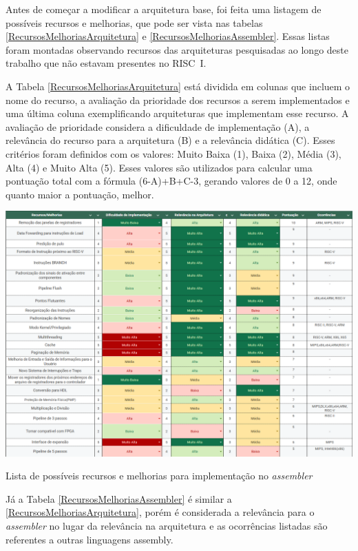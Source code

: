 \documentclass[
	12pt,				%
	openright,			%
	oneside,			%
	a4paper,			%
	english,			%
	french,				%
	spanish,			%
	brazil,				%
	]{abntex2}
\begin{document}
Antes de começar a modificar a arquitetura base, foi feita uma listagem de possíveis recursos e melhorias, que pode ser vista nas tabelas \ref{RecursosMelhoriasArquitetura} e \ref{RecursosMelhoriasAssembler}. Essas listas foram montadas observando recursos das arquiteturas pesquisadas ao longo deste trabalho que não estavam presentes no RISC~I.

A Tabela \ref{RecursosMelhoriasArquitetura} está dividida em colunas que incluem o nome do recurso, a avaliação da prioridade dos recursos a serem implementados e uma última coluna exemplificando arquiteturas que implementam esse recurso. A avaliação de prioridade considera a dificuldade de implementação (A), a relevância do recurso para a arquitetura (B) e a relevância didática (C). Esses critérios foram definidos com os valores: Muito Baixa (1), Baixa (2), Média (3), Alta (4) e Muito Alta (5). Esses valores são utilizados para calcular uma pontuação total com a fórmula (6-A)+B+C-3, gerando valores de 0 a 12, onde quanto maior a pontuação, melhor.

\begin{table}[h]
    \centering
    \includegraphics[width=1\linewidth]{RecursosMelhoriasArquitetura.png}
    \caption{Lista de possíveis recursos e melhorias para implementação no \textit{assembler}}
    \label{RecursosMelhoriasArquitetura}
\end{table}

Já a Tabela \ref{RecursosMelhoriasAssembler} é similar a \ref{RecursosMelhoriasArquitetura}, porém é considerada a relevância para o \textit{assembler} no lugar da relevância na arquitetura e as ocorrências listadas são referentes a outras linguagens assembly.
\end{document}
